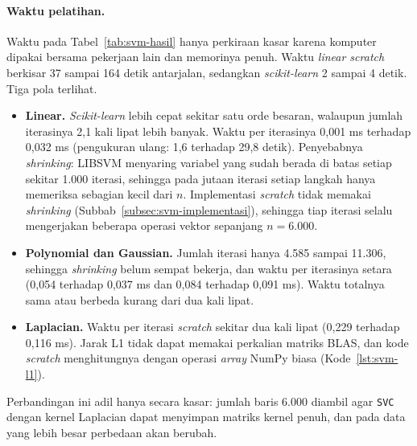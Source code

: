 \paragraph{Waktu pelatihan.} Waktu pada Tabel~\ref{tab:svm-hasil} hanya perkiraan kasar karena komputer dipakai bersama pekerjaan lain dan memorinya penuh. Waktu \textit{linear scratch} berkisar 37 sampai 164 detik antarjalan, sedangkan \textit{scikit-learn} 2 sampai 4 detik. Tiga pola terlihat.
\begin{itemize}
	\item \textbf{Linear.} \textit{Scikit-learn} lebih cepat sekitar satu orde besaran, walaupun jumlah iterasinya 2,1 kali lipat lebih banyak. Waktu per iterasinya 0,001 ms terhadap 0,032 ms (pengukuran ulang: 1,6 terhadap 29,8 detik). Penyebabnya \textit{shrinking}: LIBSVM menyaring variabel yang sudah berada di batas setiap sekitar 1.000 iterasi, sehingga pada jutaan iterasi setiap langkah hanya memeriksa sebagian kecil dari $n$. Implementasi \textit{scratch} tidak memakai \textit{shrinking} (Subbab~\ref{subsec:svm-implementasi}), sehingga tiap iterasi selalu mengerjakan beberapa operasi vektor sepanjang $n = 6.000$.
	\item \textbf{Polynomial dan Gaussian.} Jumlah iterasi hanya 4.585 sampai 11.306, sehingga \textit{shrinking} belum sempat bekerja, dan waktu per iterasinya setara (0,054 terhadap 0,037 ms dan 0,084 terhadap 0,091 ms). Waktu totalnya sama atau berbeda kurang dari dua kali lipat.
	\item \textbf{Laplacian.} Waktu per iterasi \textit{scratch} sekitar dua kali lipat (0,229 terhadap 0,116 ms). Jarak L1 tidak dapat memakai perkalian matriks BLAS, dan kode \textit{scratch} menghitungnya dengan operasi \textit{array} NumPy biasa (Kode~\ref{lst:svm-l1}).
\end{itemize}
Perbandingan ini adil hanya secara kasar: jumlah baris 6.000 diambil agar \texttt{SVC} dengan kernel Laplacian dapat menyimpan matriks kernel penuh, dan pada data yang lebih besar perbedaan akan berubah.

